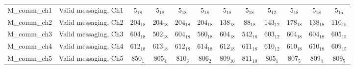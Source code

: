 \begin{center}
\begin{adjustbox}{
    max width=\textwidth,
    max totalheight=0.72\textheight,
    center
}
\begin{tabular}{l l *{10}{c}}
M\_comm\_ch1
& Valid messaging, Ch1
& $5_{18}$
& $5_{18}$
& $5_{18}$
& $5_{18}$
& $5_{18}$
& $5_{18}$
& $5_{12}$
& $5_{18}$
& $5_{18}$
& $5_{15}$
 \\

M\_comm\_ch2
& Valid messaging, Ch2
& $204_{18}$
& $204_{18}$
& $204_{18}$
& $204_{18}$
& $138_{18}$
& $88_{18}$
& $143_{12}$
& $178_{18}$
& $138_{18}$
& $110_{15}$
 \\

M\_comm\_ch3
& Valid messaging, Ch3
& $604_{18}$
& $502_{18}$
& $604_{18}$
& $560_{18}$
& $604_{18}$
& $542_{18}$
& $603_{12}$
& $604_{18}$
& $604_{18}$
& $605_{15}$
 \\

M\_comm\_ch4
& Valid messaging, Ch4
& $612_{18}$
& $613_{18}$
& $612_{18}$
& $614_{18}$
& $612_{18}$
& $611_{18}$
& $610_{12}$
& $610_{18}$
& $610_{18}$
& $609_{15}$
 \\

M\_comm\_ch5
& Valid messaging, Ch5
& $850_{1}$
& $805_{4}$
& $810_{3}$
& $806_{2}$
& $809_{10}$
& $811_{10}$
& $805_{1}$
& $807_{5}$
& $809_{4}$
& $809_{5}$
 \\

\bottomrule
\end{tabular}

\end{adjustbox}
\end{center}

\clearpage
\twocolumn
